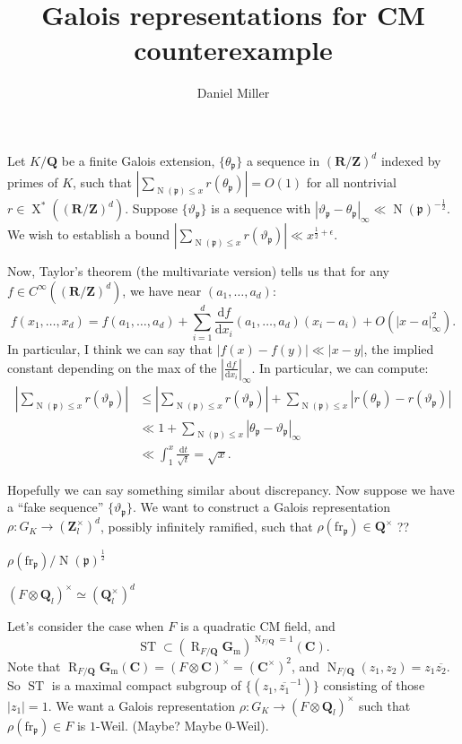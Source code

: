 \documentclass{article}
\title{Galois representations for CM counterexample}
\author{Daniel Miller}
\DeclareMathOperator{\N}{N}
\DeclareMathOperator{\R}{R}
\DeclareMathOperator{\ST}{ST}
\DeclareMathOperator{\X}{X}
\newcommand{\bC}{\mathbf{C}}
\newcommand{\bQ}{\mathbf{Q}}
\newcommand{\bR}{\mathbf{R}}
\newcommand{\bZ}{\mathbf{Z}}
\newcommand{\dd}{\mathrm{d}}
\newcommand{\fp}{\mathfrak{p}}
\newcommand{\frob}{\mathrm{fr}}
\newcommand{\Gm}{\mathbf{G}_\mathrm{m}}
\begin{document}
\maketitle





Let $K/\bQ$ be a finite Galois extension, $\{\theta_\fp\}$ a sequence in 
$(\bR/\bZ)^d$ indexed by primes of $K$, such that 
$\left|\sum_{\N(\fp)\leqslant x} r(\theta_\fp)\right| = O(1)$ for all 
nontrivial $r\in \X^\ast((\bR/\bZ)^d)$. Suppose $\{\vartheta_\fp\}$ is a 
sequence with $|\vartheta_\fp - \theta_\fp|_\infty \ll \N(\fp)^{-\frac 1 2}$. 
We wish to establish a bound 
$\left|\sum_{\N(\fp)\leqslant x} r(\vartheta_\fp)\right| \ll x^{\frac 1 2+\epsilon}$. 

Now, Taylor's theorem (the multivariate version) tells us that for any 
$f\in C^\infty((\bR/\bZ)^d)$, we have near $(a_1,\dots,a_d)$:
\[
	f(x_1,\dots,x_d) = f(a_1,\dots,a_d) + \sum_{i=1}^d \frac{\dd f}{\dd x_i}(a_1,\dots,a_d) (x_i - a_i) + O(|x-a|_\infty^2) .
\]
In particular, I think we can say that $|f(x) - f(y)| \ll |x - y|$, the implied 
constant depending on the max of the 
$\left| \frac{\dd f}{\dd x_i}\right|_\infty$. In particular, we can compute:
\begin{align*}
	\left| \sum_{\N(\fp) \leqslant x} r(\vartheta_\fp)\right|
		&\leqslant \left| \sum_{\N(\fp)\leqslant x} r(\vartheta_\fp)\right| + \sum_{\N(\fp)\leqslant x} \left| r(\theta_\fp) - r(\vartheta_\fp)\right| \\
		&\ll 1 + \sum_{\N(\fp)\leqslant x} |\theta_\fp - \vartheta_\fp|_\infty \\
		&\ll \int_1^x \frac{\dd t}{\sqrt t} = \sqrt{x} .
\end{align*}

Hopefully we can say something similar about discrepancy. Now suppose we have a 
``fake sequence'' $\{\vartheta_\fp\}$. We want to construct a Galois 
representation $\rho\colon G_K \to \left(\bZ_l^\times\right)^d$, possibly 
infinitely ramified, such that $\rho(\frob_\fp)\in \bQ^\times$ ??

$\rho(\frob_\fp) / \N(\fp)^{\frac 1 2}$

$(F\otimes \bQ_l)^\times \simeq (\bQ_l^\times)^d$

Let's consider the case when $F$ is a quadratic CM field, and 
\[
	\ST \subset (\R_{F/\bQ}\Gm)^{\N_{F/\bQ} = 1}(\bC) .
\]
Note that $\R_{F/\bQ}\Gm(\bC) = (F\otimes \bC)^\times = (\bC^\times)^2$, and 
$\N_{F/\bQ}(z_1,z_2) = z_1 \overline{z_2}$. So $\ST$ is a maximal compact 
subgroup of $\{(z_1,\overline{z_1}^{-1})\}$ consisting of those 
$|z_1| = 1$. We want a Galois representation 
$\rho\colon G_K \to (F\otimes \bQ_l)^\times$ such that 
$\rho(\frob_\fp)\in F$ is $1$-Weil. (Maybe? Maybe 0-Weil).
\end{document}
